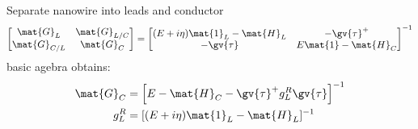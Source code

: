 	Separate nanowire into leads and conductor
\begin{align}
  \begin{bmatrix}
  \mat{G}_{L} & \mat{G}_{L/C}\\
  \mat{G}_{C/L} & \mat{G}_{C}
  \end{bmatrix}
  =
  \begin{bmatrix}
  (E+i\eta)\mat{1}_{L} - \mat{H}_L  & -\gv{\tau}^+ \\
	-\gv{\tau} & E\mat{1} - \mat{H}_C
  \end{bmatrix}^{-1}
  \label{green divided}
\end{align}
basic agebra obtains:
\begin{align} \mat{G}_C& = \left[E-\mat{H}_C - \gv{\tau}^+ g_L^R \gv{\tau}\right]^{-1} \\
g_L^R &= [(E+i\eta)\mat{1}_L - \mat{H}_L]^{-1}
\end{align}
